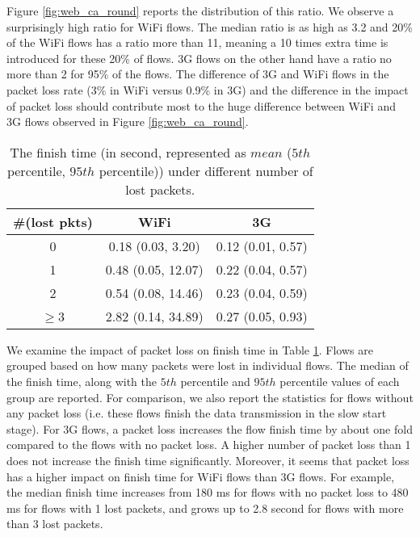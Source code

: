 Figure \ref{fig:web_ca_round} reports the distribution of this ratio. We observe a surprisingly high ratio for WiFi flows. The median ratio is as high as 3.2 and 20\% of the WiFi flows has a ratio more than 11, meaning a 10 times extra time is introduced for these 20\% of flows. 3G flows on the other hand have a ratio no more than 2 for 95\% of the flows. The difference of 3G and WiFi flows in the packet loss rate (3\% in WiFi versus 0.9\% in 3G) and the difference in the impact of packet loss should contribute most to the huge difference between WiFi and 3G flows observed in Figure  \ref{fig:web_ca_round}. 



\begin{table}[th]
\caption{The finish time (in second, represented as $mean$ ($5th$ percentile, $95th$ percentile)) under different number of lost packets.}
\label{tab:web_loss_finish_time}
\centering
\renewcommand{\arraystretch}{1.0}
\begin{tabular}{c|c|c}
\hline
\#(lost pkts) & WiFi & 3G\\
\hline
0 & 0.18 (0.03, 3.20) & 0.12 (0.01, 0.57) \\
%
1 & 0.48 (0.05, 12.07) & 0.22 (0.04, 0.57) \\
%
2 & 0.54 (0.08, 14.46) & 0.23 (0.04, 0.59) \\
%
$\ge$3 & 2.82 (0.14, 34.89) & 0.27 (0.05, 0.93) \\
\hline
\end{tabular}
\end{table}

We examine the impact of packet loss on finish time in Table \ref{tab:web_loss_finish_time}. Flows are grouped based on how many packets were lost in individual flows. The median of the finish time, along with the $5th$ percentile and $95th$ percentile values of each group are reported. For comparison, we also report the statistics for flows without any packet loss (i.e. these flows finish the data transmission in the slow start stage). For 3G flows, a packet loss increases the flow finish time by about one fold compared to the flows with no packet loss. A higher number of packet loss than 1 does not increase the finish time significantly. Moreover, it seems that packet loss has a higher impact on finish time for WiFi flows than 3G flows. For example, the median finish time increases from 180 ms for flows with no packet loss to 480 ms for flows with 1 lost packets, and grows up to 2.8 second for flows with more than 3 lost packets. 

